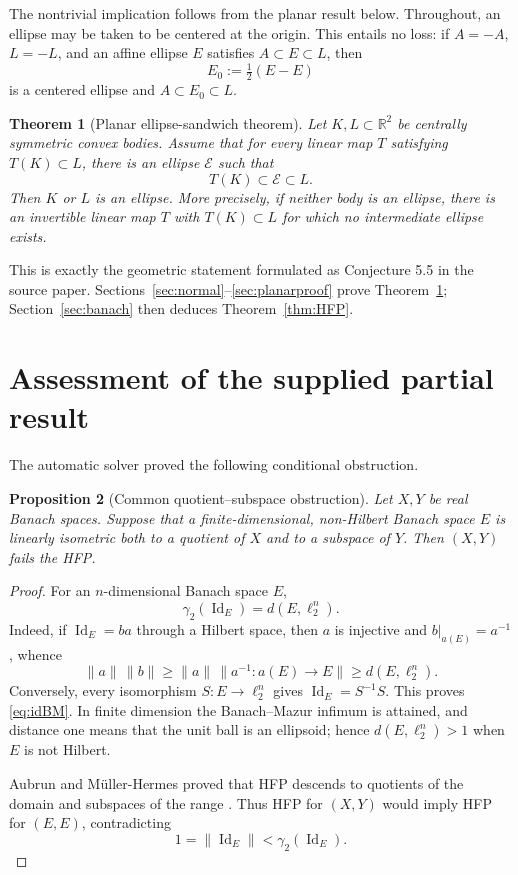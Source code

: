 \documentclass[11pt]{amsart}
\newtheorem{theorem}{Theorem}[section]
\newtheorem{proposition}[theorem]{Proposition}
\theoremstyle{definition}
\theoremstyle{remark}
\newcommand{\R}{\mathbb R}
\newcommand{\Id}{\operatorname{Id}}
\newcommand{\ga}{\gamma_2}
\begin{document}
The nontrivial implication follows from the planar result below.  Throughout,
an ellipse may be taken to be centered at the origin.  This entails no loss:
if $A=-A$, $L=-L$, and an affine ellipse $E$ satisfies $A\subset E\subset L$,
then
\[
 E_0:=\tfrac12(E-E)
\]
is a centered ellipse and $A\subset E_0\subset L$.

\begin{theorem}[Planar ellipse-sandwich theorem]\label{thm:planar}
Let $K,L\subset\R^2$ be centrally symmetric convex bodies.  Assume that for
every linear map $T$ satisfying $T(K)\subset L$, there is an ellipse
$\mathcal E$ such that
\[
 T(K)\subset \mathcal E\subset L.
\]
Then $K$ or $L$ is an ellipse.  More precisely, if neither body is an
ellipse, there is an \emph{invertible} linear map $T$ with $T(K)\subset L$
for which no intermediate ellipse exists.
\end{theorem}

This is exactly the geometric statement formulated as Conjecture 5.5 in the
source paper.  Sections~\ref{sec:normal}--\ref{sec:planarproof} prove
Theorem~\ref{thm:planar}; Section~\ref{sec:banach} then deduces
Theorem~\ref{thm:HFP}.

\section{Assessment of the supplied partial result}\label{sec:partial}

The automatic solver proved the following conditional obstruction.

\begin{proposition}[Common quotient--subspace obstruction]\label{prop:partial}
Let $X,Y$ be real Banach spaces.  Suppose that a finite-dimensional,
non-Hilbert Banach space $E$ is linearly isometric both to a quotient of $X$
and to a subspace of $Y$.  Then $(X,Y)$ fails the HFP.
\end{proposition}

\begin{proof}
For an $n$-dimensional Banach space $E$,
\begin{equation}\label{eq:idBM}
 \ga(\Id_E)=d(E,\ell_2^n).
\end{equation}
Indeed, if $\Id_E=ba$ through a Hilbert space, then $a$ is injective and
$b|_{a(E)}=a^{-1}$, whence
\[
 \|a\|\,\|b\|\geq \|a\|\,\|a^{-1}:a(E)\to E\|\geq d(E,\ell_2^n).
\]
Conversely, every isomorphism $S:E\to\ell_2^n$ gives
$\Id_E=S^{-1}S$.  This proves \eqref{eq:idBM}.  In finite dimension the
Banach--Mazur infimum is attained, and distance one means that the unit ball is
an ellipsoid; hence $d(E,\ell_2^n)>1$ when $E$ is not Hilbert.

Aubrun and M\"uller-Hermes proved that HFP descends to quotients of the domain
and subspaces of the range \cite[Proposition 5.4]{AMH-limit}.  Thus HFP for
$(X,Y)$ would imply HFP for $(E,E)$, contradicting
\[
 1=\|\Id_E\|<\ga(\Id_E).
\]
\end{proof}
\end{document}
